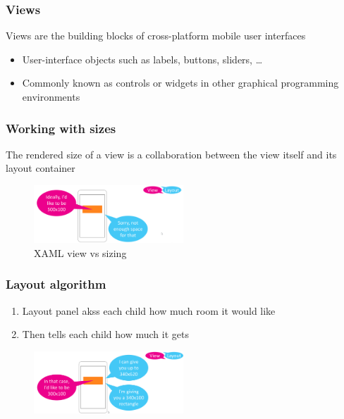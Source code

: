 \documentclass{article}
\begin{document}
\subsubsection{Views}

Views are the building blocks of cross-platform mobile user interfaces

\begin{itemize}
    \item User-interface objects such as labels, buttons, sliders, \dots
    \item Commonly known as controls or widgets in other graphical programming environments
\end{itemize}

\subsubsection{Working with sizes}

The rendered size of a view is a collaboration between the view itself and its layout container

\begin{figure}[H]
    \centering
    \includegraphics[width=0.5\textwidth]{xaml-view-sizing.png}
    \caption{XAML view vs sizing}
\end{figure}

\subsubsection{Layout algorithm}

\begin{enumerate}
    \item Layout panel akss each child how much room it would like
    \item Then tells each child how much it gets
\end{enumerate}


\begin{figure}[H]
    \centering
    \includegraphics[width=0.5\textwidth]{xaml-view-layout.png}
    \caption{}
\end{figure}
\end{document}
